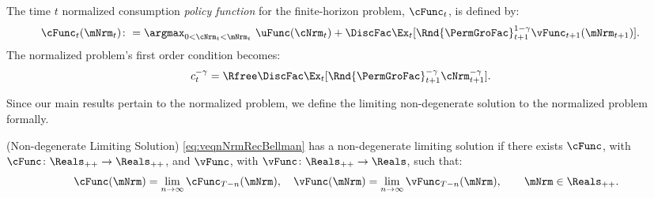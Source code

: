 \documentclass[BufferStockTheory]{subfiles}
\begin{document}
The time $t$ normalized consumption \textit{policy function} for the finite-horizon problem, $\cFunc_{t}$, is defined by:
%
\begin{equation}\label{eq:cfunceq1}
  \begin{aligned}
    \cFunc_{t}(\mNrm_{t})\colon & = \argmax_{0<\cNrm_{t}< \mNrm_{t}}~  \uFunc(\cNrm_{t}) +\DiscFac \Ex_{t}[\Rnd{\PermGroFac}_{t+1}^{1-\CRRA}\vFunc_{t+1}(\mNrm_{t+1} )].
  \end{aligned}
\end{equation}
% 
The normalized problem's first order condition becomes:
\begin{equation}\begin{gathered}\begin{aligned}
  c_{t}^{-\CRRA}  & = \Rfree \DiscFac \Ex_{t}[ \Rnd{\PermGroFac}_{t+1}^{-\CRRA} \cNrm_{t+1}^{-\CRRA}].  \label{eq:scaledeuler}
\end{aligned}\end{gathered}\end{equation}

\hypertarget{sensible}{}\hypertarget{useful}{}
\hypertarget{Definition-of-a-Nondegenerate-Solution and Bellman}{}
Since our main results pertain to the normalized problem, we define the limiting non-degenerate solution to the normalized problem formally.

\begin{definition}\label{def:nondegeneracy}(Non-degenerate Limiting Solution)
\ref{eq:veqnNrmRecBellman} has a non-degenerate limiting solution if there exists $ \usual{\cFunc}$, with $\usual{\cFunc}\colon \Reals_{++}\rightarrow \Reals_{++}$, and $ \usual{\vFunc}$, with $\usual{\vFunc}\colon \Reals_{++}\rightarrow \Reals$, such that:
%
\begin{equation}\begin{gathered}\begin{aligned}
  \usual{\cFunc}(\mNrm) =  \lim_{n \rightarrow \infty} \cFunc_{T-n}(\mNrm), \quad \usual{\vFunc}(\mNrm)  =  \lim_{n \rightarrow \infty} \vFunc_{T-n}(\mNrm), \qquad \mNrm \in \Reals_{++} \notag.
\end{aligned}\end{gathered}\end{equation}
\end{definition}


\hypertarget{Stationary-Bellman-Operator}{}
\end{document}
